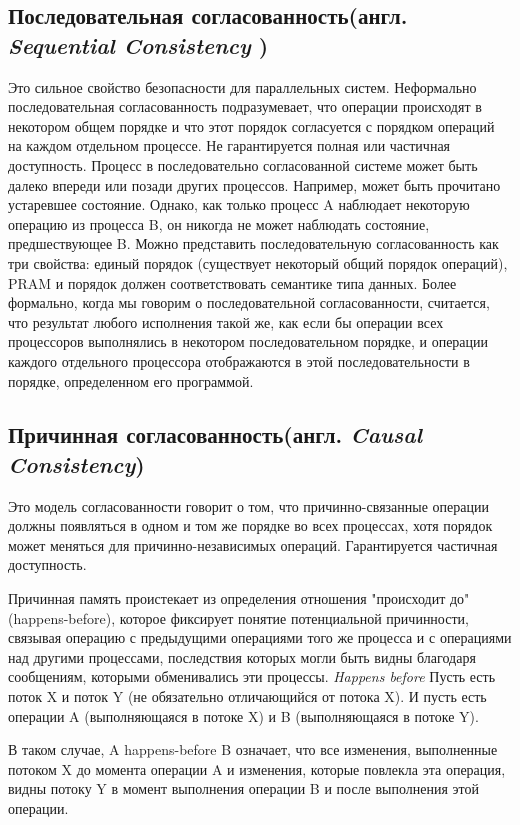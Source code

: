 \documentclass[12pt,  openany]{book}
\begin{document}
\subsection{Последовательная согласованность(англ.  \textit{Sequential Consistency })}
Это сильное свойство безопасности для параллельных систем. Неформально последовательная согласованность подразумевает, что операции происходят в некотором общем порядке и что этот порядок согласуется с порядком операций на каждом отдельном процессе.
Не гарантируется полная или частичная доступность.
Процесс в последовательно согласованной системе может быть далеко впереди или позади других процессов. Например, может быть прочитано устаревшее состояние. Однако, как только процесс A наблюдает некоторую операцию из процесса B, он никогда не может наблюдать состояние, предшествующее B.
Можно представить последовательную согласованность как три свойства: единый порядок (существует некоторый общий порядок операций), PRAM и порядок должен соответствовать семантике типа данных.
Более формально, когда мы говорим о последовательной согласованности, считается, что результат любого исполнения такой же, как если бы операции всех процессоров выполнялись в некотором последовательном порядке, и операции каждого отдельного процессора отображаются в этой последовательности в порядке, определенном его программой.

\subsection{Причинная согласованность(англ.  \textit{Causal Consistency})}
Это модель согласованности говорит о том, что причинно-связанные операции должны появляться в одном и том же порядке во всех процессах, хотя порядок может меняться для причинно-независимых операций.
Гарантируется частичная доступность.
\par
Причинная память проистекает из определения отношения "происходит до"(happens-before), которое фиксирует понятие потенциальной причинности, связывая операцию с предыдущими операциями того же процесса и с операциями над другими процессами, последствия которых могли быть видны благодаря сообщениям, которыми обменивались эти процессы.
\textit{Happens before} \newline
Пусть есть поток X и поток Y (не обязательно отличающийся от потока X). И пусть есть операции A (выполняющаяся в потоке X) и B (выполняющаяся в потоке Y).
\par
В таком случае, A happens-before B означает, что все изменения, выполненные потоком X до момента операции A и изменения, которые повлекла эта операция, видны потоку Y в момент выполнения операции B и после выполнения этой операции.
\end{document}
